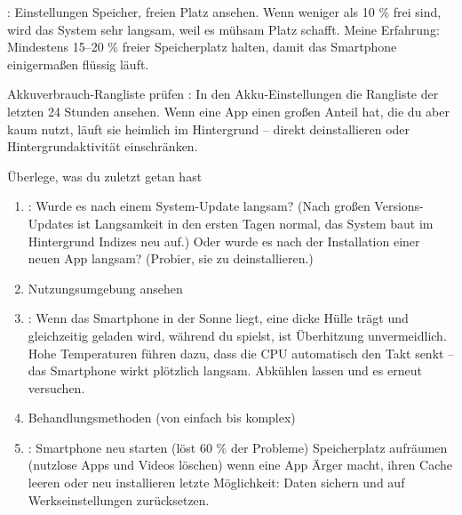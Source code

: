 : Einstellungen Speicher, freien Platz ansehen. Wenn weniger als 10 \% frei sind, wird das System sehr langsam, weil es mühsam Platz schafft. Meine Erfahrung: Mindestens 15–20 \% freier Speicherplatz halten, damit das Smartphone einigermaßen flüssig läuft.

\begin{tcbwarn}{Akkuverbrauch-Rangliste prüfen}
: In den Akku-Einstellungen die Rangliste der letzten 24 Stunden ansehen. Wenn eine App einen großen Anteil hat, die du aber kaum nutzt, läuft sie heimlich im Hintergrund – direkt deinstallieren oder Hintergrundaktivität einschränken.

\end{tcbwarn}

\begin{tcbpractice}{Überlege, was du zuletzt getan hast}
\begin{enumerate}
  \item : Wurde es nach einem System-Update langsam? (Nach großen Versions-Updates ist Langsamkeit in den ersten Tagen normal, das System baut im Hintergrund Indizes neu auf.) Oder wurde es nach der Installation einer neuen App langsam? (Probier, sie zu deinstallieren.)
  \item Nutzungsumgebung ansehen
  \item : Wenn das Smartphone in der Sonne liegt, eine dicke Hülle trägt und gleichzeitig geladen wird, während du spielst, ist Überhitzung unvermeidlich. Hohe Temperaturen führen dazu, dass die CPU automatisch den Takt senkt – das Smartphone wirkt plötzlich langsam. Abkühlen lassen und es erneut versuchen.
  \item Behandlungsmethoden (von einfach bis komplex)
  \item : Smartphone neu starten (löst 60 \% der Probleme) Speicherplatz aufräumen (nutzlose Apps und Videos löschen) wenn eine App Ärger macht, ihren Cache leeren oder neu installieren letzte Möglichkeit: Daten sichern und auf Werkseinstellungen zurücksetzen.
\end{enumerate}

\end{tcbpractice}
